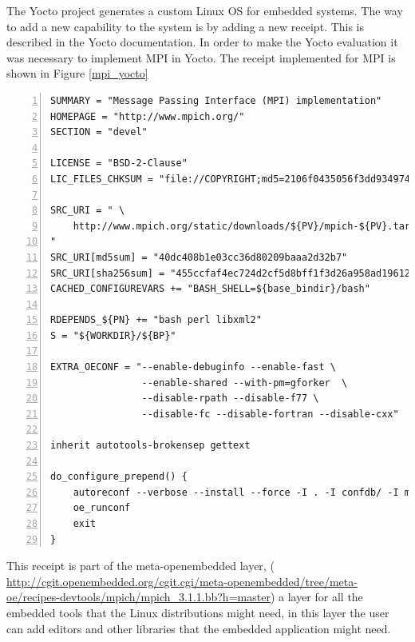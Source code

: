 The Yocto project \cite{yocto-project} generates a custom Linux OS for
embedded systems. The way to add a new capability to the system is by adding a
new receipt. This is described in the Yocto documentation. In order to make the
Yocto evaluation it was necessary to implement MPI in Yocto. The receipt
implemented for MPI is shown in Figure \ref{mpi_yocto}

\begin{minipage}{\textwidth}
\end{minipage}

\begin{minipage}{\textwidth}

\begin{lstlisting}[frame=single,numbers=left,breaklines=true]
SUMMARY = "Message Passing Interface (MPI) implementation"
HOMEPAGE = "http://www.mpich.org/"
SECTION = "devel"

LICENSE = "BSD-2-Clause"
LIC_FILES_CHKSUM = "file://COPYRIGHT;md5=2106f0435056f3dd9349747a766e5816"

SRC_URI = " \
	http://www.mpich.org/static/downloads/${PV}/mpich-${PV}.tar.gz \
"
SRC_URI[md5sum] = "40dc408b1e03cc36d80209baaa2d32b7"
SRC_URI[sha256sum] = "455ccfaf4ec724d2cf5d8bff1f3d26a958ad196121e7ea26504fd3018757652d"
CACHED_CONFIGUREVARS += "BASH_SHELL=${base_bindir}/bash"

RDEPENDS_${PN} += "bash perl libxml2"
S = "${WORKDIR}/${BP}"

EXTRA_OECONF = "--enable-debuginfo --enable-fast \
                --enable-shared --with-pm=gforker  \
		        --disable-rpath --disable-f77 \
                --disable-fc --disable-fortran --disable-cxx"

inherit autotools-brokensep gettext

do_configure_prepend() {
    autoreconf --verbose --install --force -I . -I confdb/ -I maint/
    oe_runconf
    exit
}

\end{lstlisting}
\label{mpi_yocto} 
\end{minipage}

This receipt is part of the meta-openembedded layer, (
\url{http://cgit.openembedded.org/cgit.cgi/meta-openembedded/tree/meta-oe/recipes-devtools/mpich/mpich_3.1.1.bb?h=master})
a layer for all the embedded tools that the Linux distributions might need, in this
layer the user can add editors and other libraries that the embedded
application might need.


